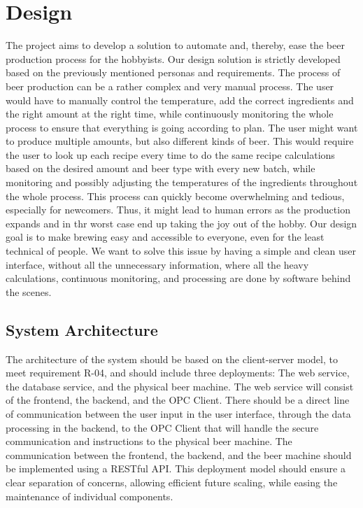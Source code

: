 \section{Design}
The project aims to develop a solution to automate and, thereby, ease the beer production process for the hobbyists. Our design solution is strictly developed based on the previously mentioned personas and requirements.\newline
The process of beer production can be a rather complex and very manual process. The user would have to manually control the temperature, add the correct ingredients and the right amount at the right time, while continuously monitoring the whole process to ensure that everything is going according to plan.\newline
The user might want to produce multiple amounts, but also different kinds of beer. This would require the user to look up each recipe every time to do the same recipe calculations based on the desired amount and beer type with every new batch, while monitoring and possibly adjusting the temperatures of the ingredients throughout the whole process.\newline
This process can quickly become overwhelming and tedious, especially for newcomers. Thus, it might lead to human errors as the production expands and in thr worst case end up taking the joy out of the hobby.\newline
Our design goal is to make brewing easy and accessible to everyone, even for the least technical of people. We want to solve this issue by having a simple and clean user interface, without all the unnecessary information, where all the heavy calculations, continuous monitoring, and processing are done by software behind the scenes.\newline

\subsection{System Architecture}
The architecture of the system should be based on the client-server model, to meet requirement R-04, and should include three deployments: The web service, the database service, and the physical beer machine. \newline
The web service will consist of the frontend, the backend, and the OPC Client. There should be a direct line of communication between the user input in the user interface, through the data processing in the backend, to the OPC Client that will handle the secure communication and instructions to the physical beer machine. \newline
The communication between the frontend, the backend, and the beer machine should be implemented using a RESTful API. \newline
This deployment model should ensure a clear separation of concerns, allowing efficient future scaling, while easing the maintenance of individual components.

